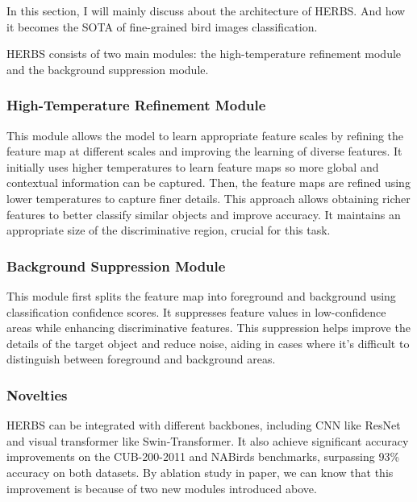 \documentclass[twocolumn]{extarticle}
\begin{document}
In this section, I will mainly discuss about the architecture of HERBS. And how it becomes the SOTA of fine-grained bird images classification.

HERBS consists of two main modules: the high-temperature refinement module and the background suppression module.

\subsubsection{High-Temperature Refinement Module}

This module allows the model to learn appropriate feature scales by refining the feature map at different scales and improving the learning of diverse features. It initially uses higher temperatures to learn feature maps so more global and contextual information can be captured. Then, the feature maps are refined using lower temperatures to capture finer details. This approach allows obtaining richer features to better classify similar objects and improve accuracy. It maintains an appropriate size of the discriminative region, crucial for this task.


\subsubsection{Background Suppression Module}

This module first splits the feature map into foreground and background using classification confidence scores. It suppresses feature values in low-confidence areas while enhancing discriminative features. This suppression helps improve the details of the target object and reduce noise, aiding in cases where it's difficult to distinguish between foreground and background areas.

\subsubsection{Novelties}

HERBS can be integrated with different backbones, including CNN like ResNet and visual transformer like Swin-Transformer. It also achieve significant accuracy improvements on the CUB-200-2011 and NABirds benchmarks, surpassing 93\% accuracy on both datasets. By ablation study in paper, we can know that this improvement is because of two new modules introduced above.
\end{document}
